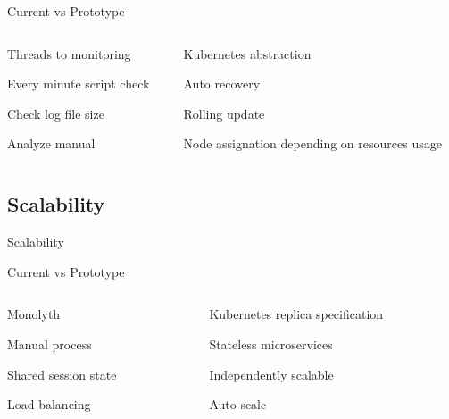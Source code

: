 \documentclass{beamer}
\newenvironment{wideitemize}{\itemize\addtolength{\itemsep}{20pt}}{\enditemize}
\newcommand{\hugeframe}[1]{
\begin{frame}[c]
  \begin{center}
    \huge\textcolor{title}{#1}
  \end{center}

\end{frame}
}
\begin{document}
\begin{frame}{Current vs Prototype}
  \begin{columns}[T] %
    \begin{column}{.48\textwidth}
      \begin{wideitemize}
        \item Threads to monitoring
        \item Every minute script check
        \item Check log file size
        \item Analyze manual
      \end{wideitemize}
    
    \end{column}%
    \hfill%
    \begin{column}{.48\textwidth}
      \begin{wideitemize}
        \item Kubernetes abstraction
        \item Auto recovery
        \item Rolling update
        \item Node assignation depending on resources usage
      \end{wideitemize}
    
    \end{column}%
  \end{columns}
\end{frame}



\subsection{Scalability}
\hugeframe{Scalability}

\begin{frame}{Current vs Prototype}
  \begin{columns}[T] %
    \begin{column}{.48\textwidth}
      \begin{wideitemize}
        \item Monolyth
        \item Manual process
        \item Shared session state
        \item Load balancing
      \end{wideitemize}
    
    \end{column}%
    \hfill%
    \begin{column}{.48\textwidth}
      \begin{wideitemize}
        \item Kubernetes replica specification
        \item Stateless microservices
        \item Independently scalable
        \item Auto scale
      \end{wideitemize}
    
    \end{column}%
  \end{columns}
\end{frame}
\end{document}
